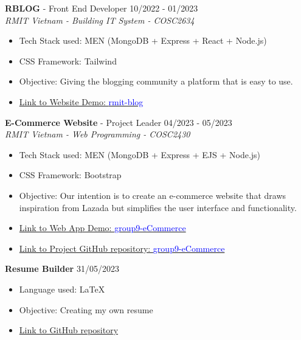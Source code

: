 \documentclass[11pt]{article}
\newcommand{\job}[3]{
    \begingroup
        \textbf{\small#1} - \small#2
        \hfill\color{black!70}\small{#3}
    \endgroup
}
\newcommand{\project}[2]{
    \begingroup
        \textbf{\small#1}
        \hfill\color{black!70}\small{#2}
    \endgroup
}
\newcommand{\spacevv}{
    \vspace{2mm}
}
\begin{document}
\begin{paracol}{2}
{      \job{RBLOG}{Front End Developer}{10/2022 - 01/2023} \\
      \textcolor{black!70}{\textit{RMIT Vietnam - Building IT System - COSC2634}}
\vspace{1mm}
      \begin{itemize}
        \item Tech Stack used: MEN (MongoDB + Express + React + Node.js)
\vspace{1mm}
        \item CSS Framework: Tailwind
\vspace{1mm}
        \item Objective: Giving the blogging community a platform that is easy to use.
\vspace{1mm}
        \item  \href{https://rmit-blog.netlify.app/}{Link to Website Demo: \textcolor{blue}{rmit-blog}}
      \end{itemize}
      \spacevv
\vspace{2mm}
      \job{E-Commerce Website}{Project Leader}{04/2023 - 05/2023} \\
      \textcolor{black!70}{\textit{RMIT Vietnam - Web Programming - COSC2430}}
\vspace{1mm}
      \begin{itemize}
        \item Tech Stack used: MEN (MongoDB + Express + EJS + Node.js)
\vspace{1mm}
        \item CSS Framework: Bootstrap
\vspace{1mm}
        \item Objective: Our intention is to create an e-commerce website that draws inspiration from Lazada but simplifies the user interface and functionality.
\vspace{1mm}
        \item  \href{https://group9ecommerceweb-dolelongan.b4a.run/}{Link to Web App Demo: \textcolor{blue}{group9-eCommerce}}
\vspace{1mm}
        \item  \href{https://github.com/LaansDole/Group9_E-commerce_Website}{Link to Project GitHub repository: \textcolor{blue}{group9-eCommerce}}
      \end{itemize}
      \spacevv
\vspace{2mm}
\project{Resume Builder}{31/05/2023}
      \begin{itemize}
        \item Language used: LaTeX
\vspace{1mm}
        \item Objective: Creating my own resume
\vspace{1mm}
        \item  \textcolor{blue}{\href{https://github.com/LaansDole/my-resume}{Link to GitHub repository}}
      \end{itemize}
    }


\end{paracol}
\end{document}
